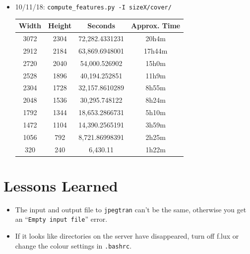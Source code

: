 \documentclass[11pt,a4paper]{report}
\begin{document}
\begin{itemize}
\item 10/11/18: \texttt{compute\_features.py -I sizeX/cover/}
  \begin{center}
  \begin{tabular}{ c c | c c }
  Width & Height & Seconds & Approx. Time \\ \hline
  3072 & 2304 & 72,282.4331231 & 20h4m \\
  2912 & 2184 & 63,869.6948001 & 17h44m \\
  2720 & 2040 & 54,000.526902 & 15h0m \\
  2528 & 1896 & 40,194.252851 & 11h9m \\
  2304 & 1728 & 32,157.8610289 & 8h55m \\
  2048 & 1536 & 30,295.748122 & 8h24m \\
  1792 & 1344 & 18,653.2866731 & 5h10m \\
  1472 & 1104 & 14,390.2565191 & 3h59m \\
  1056 & 792 & 8,721.86998391 & 2h25m \\
  320 & 240 & 6,430.11 & 1h22m \\
  \end{tabular}
  \end{center}

\end{itemize}

\section{Lessons Learned}
\label{sec:lessons-learned}

\begin{itemize}

\item The input and output file to \texttt{jpegtran} can't be the same, otherwise you get an ``\texttt{Empty input file}'' error.

\item If it looks like directories on the server have disappeared, turn off f.lux or change the colour settings in \texttt{.bashrc}.

\end{itemize}
\end{document}

